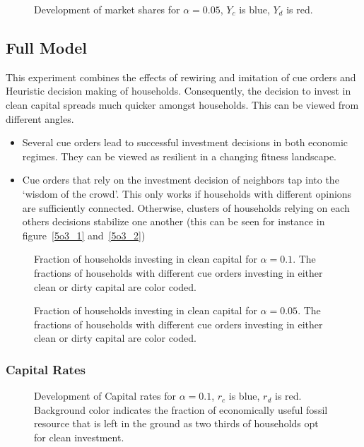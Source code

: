 \begin{figure}[t]
	\centering
	\caption{Development of market shares for $\alpha=0.05$, $Y_c$ is blue, $Y_d$ is red.}

\end{figure}


\subsection{Full Model}
This experiment combines the effects of rewiring and imitation of cue orders and Heuristic decision making of households. Consequently, the decision to invest in clean capital spreads much quicker amongst households. This can be viewed from different angles.
\begin{itemize}
	\item Several cue orders lead to successful investment decisions in both economic regimes. They can be viewed as resilient in a changing fitness landscape.
	\item Cue orders that rely on the investment decision of neighbors tap into the `wisdom of the crowd'. This only works if households with different opinions are sufficiently connected. Otherwise, clusters of households relying on each others decisions stabilize one another (this can be seen for instance in figure~\ref{5o3_1} and~\ref{5o3_2})
\end{itemize}

\begin{figure}[t]
	\centering
	\caption{Fraction of households investing in clean capital for $\alpha=0.1$. The fractions of households with different cue orders investing in either clean or dirty capital are color coded.}
	\label{5o2_1}
\end{figure}
\begin{figure}[t]
	\centering
	\caption{Fraction of households investing in clean capital for $\alpha=0.05$. The fractions of households with different cue orders investing in either clean or dirty capital are color coded.}
	\label{5o2_2}
\end{figure}
\subsubsection{Capital Rates}
\begin{figure}[t]
	\centering
	\caption{Development of Capital rates for $\alpha=0.1$, $r_c$ is blue, $r_d$ is red. Background color indicates the fraction of economically useful fossil resource that is left in the ground as two thirds of households opt for clean investment.}

\end{figure}


